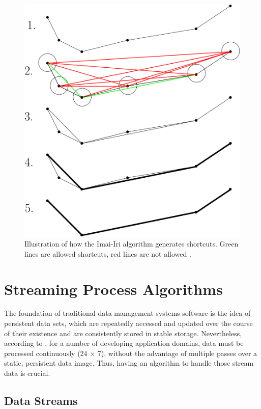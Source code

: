 \begin{figure}[!ht]
    \centering
    \includegraphics[width=0.5\linewidth]{figures/imaiiri.png}
    \caption[Illustration of Imai-Iri algorithm \cite{van2017extensive}]{Illustration of how the Imai-Iri algorithm generates
    shortcuts. Green lines are allowed shortcuts, red
    lines are not allowed \cite{van2017extensive}.}
    \label{fig:imai}
\end{figure}


\section{Streaming Process Algorithms}

The foundation of traditional data-management systems software is the idea of persistent data sets, which are repeatedly accessed and updated over the course of their existence and are consistently stored in stable storage. Nevertheless, according to \cite{garofalakis2016data}, for a number of developing application domains, data must be processed continuously (24 × 7), without the advantage of multiple passes over a static, persistent data image. Thus, having an algorithm to handle those stream data is crucial.

\subsection{Data Streams}

